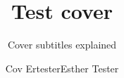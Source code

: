 \title{Test cover}
\author{Cov Ertester\lastand Esther Tester}
\subtitle{Cover subtitles explained}
\renewcommand{\lsSpineAuthor}{Spine Author \& Short Author}
\renewcommand{\lsISBNdigital}{978-3-00000-000-8}
\renewcommand{\lsISBNhardcover}{978-3-00000-001-5}
\renewcommand{\lsSeries}{cam} %
\renewcommand{\lsSeriesNumber}{1} %
\renewcommand{\lsID}{42} %
